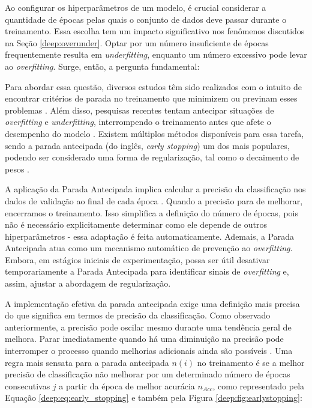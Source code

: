 Ao configurar os hiperparâmetros de um modelo, é crucial considerar a quantidade de épocas pelas quais o conjunto de dados deve passar durante o treinamento. Essa escolha tem um impacto significativo nos fenômenos discutidos na Seção \ref{deep:overunder}. Optar por um número insuficiente de épocas frequentemente resulta em \textit{underfitting}, enquanto um número excessivo pode levar ao \textit{overfitting}. Surge, então, a pergunta fundamental: 

Para abordar essa questão, diversos estudos têm sido realizados com o intuito de encontrar critérios de parada no treinamento que minimizem ou previnam esses problemas \citep{Prechelt1998AutomaticCriteria}. Além disso, pesquisas recentes tentam antecipar situações de \textit{overfitting} e \textit{underfitting}, interrompendo o treinamento antes que afete o desempenho do modelo \citep{VilaresFerro2023EarlyNetworks}. Existem múltiplos métodos disponíveis para essa tarefa, sendo a parada antecipada (do inglês, \textit{early stopping}) um dos mais populares, podendo ser considerado uma forma de regularização, tal como o decaimento de pesos \citep{VilaresFerro2023EarlyNetworks}.

A aplicação da Parada Antecipada implica calcular a precisão da classificação nos dados de validação ao final de cada época \citep{Prechelt1998AutomaticCriteria}. Quando a precisão para de melhorar, encerramos o treinamento. Isso simplifica a definição do número de épocas, pois não é necessário explicitamente determinar como ele depende de outros hiperparâmetros - essa adaptação é feita automaticamente. Ademais, a Parada Antecipada atua como um mecanismo automático de prevenção ao \textit{overfitting}. Embora, em estágios iniciais de experimentação, possa ser útil desativar temporariamente a Parada Antecipada para identificar sinais de \textit{overfitting} e, assim, ajustar a abordagem de regularização.

A implementação efetiva da parada antecipada exige uma definição mais precisa do que significa  em termos de precisão da classificação. Como observado anteriormente, a precisão pode oscilar mesmo durante uma tendência geral de melhora. Parar imediatamente quando há uma diminuição na precisão pode interromper o processo quando melhorias adicionais ainda são possíveis \citep{Prechelt1998EarlyWhen}. Uma regra mais sensata para a parada antecipada $n(i)$ no treinamento é se a melhor precisão de classificação não melhorar por um determinado número de épocas consecutivas $j$ a partir da época de melhor acurácia $n_{Acc}$, como representado pela Equação \ref{deep:eq:early_stopping} e também pela Figura \ref{deep:fig:earlystopping}:

